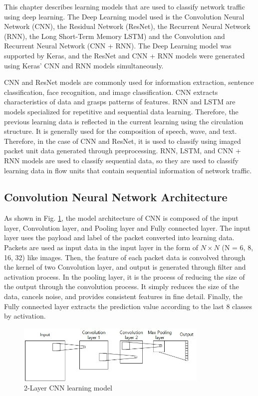 This chapter describes learning models that are used to classify network traffic using deep learning.
The Deep Learning model used is the Convolution Neural Network (CNN), the Residual Network (ResNet), the Recurrent Neural Network (RNN), the Long Short-Term Memory LSTM) and the Convolution and Recurrent Neural Network (CNN + RNN).
The Deep Learning model was supported by Keras, and the ResNet and CNN + RNN models were generated using Keras' CNN and RNN models simultaneously.

CNN and ResNet models are commonly used for information extraction, sentence classification, face recognition, and image classification.
CNN extracts characteristics of data and grasps patterns of features.
RNN and LSTM are models specialized for repetitive and sequential data learning.
Therefore, the previous learning data is reflected in the current learning using the circulation structure.
It is generally used for the composition of speech, wave, and text.
Therefore, in the case of CNN and ResNet, it is used to classify using imaged packet unit data generated through preprocessing. RNN, LSTM, and CNN + RNN models are used to classify sequential data, so they are used to classify learning data in flow units that contain sequential information of network traffic.

\subsection{Convolution Neural Network Architecture}
As shown in Fig. \ref{fig3}, the model architecture of CNN\cite{Krizhevsky:2012:ICD:2999134.2999257} is composed of the input layer, Convolution layer, and Pooling layer and Fully connected layer.
The input layer uses the payload and label of the packet converted into learning data. Packets are used as input data in the input layer in the form of $N \times N$ (N = 6, 8, 16, 32) like images.
Then, the feature of each packet data is convolved through the kernel of two Convolution layer, and output is generated through filter and activation process.
In the pooling layer, it is the process of reducing the size of the output through the convolution process.
It simply reduces the size of the data, cancels noise, and provides consistent features in fine detail.
Finally, the Fully connected layer extracts the prediction value according to the last 8 classes by activation.

\begin{figure}[t]
\centering
\setlength{\abovecaptionskip}{0pt}
\setlength{\belowcaptionskip}{0pt}
{
\includegraphics[width=3.6in]{fig3.jpg}
\caption{2-Layer CNN learning model}
\label{fig3}
}
\end{figure}


